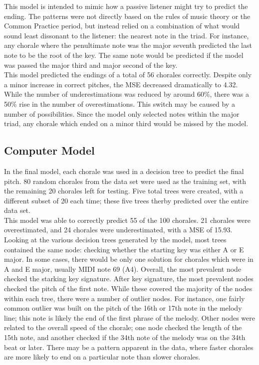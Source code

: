 \documentclass[12pt]{article}
\begin{document}
This model is intended to mimic how a passive listener might try to predict the ending. The patterns were not directly based on the rules of music theory or the Common Practice period, but instead relied on a combination of what would sound least dissonant to the listener: the nearest note in the triad. For instance, any chorale where the penultimate note was the major seventh predicted the last note to be the root of the key. The same note would be predicted if the model was passed the major third and major second of the key.\\

This model predicted the endings of a total of 56 chorales correctly. Despite only a minor increase in correct pitches, the MSE decreased dramatically to 4.32. While the number of underestimations was reduced by around 60\%, there was a 50\% rise in the number of overestimations. This switch may be caused by a number of possibilities. Since the model only selected notes within the major triad, any chorale which ended on a minor third would be missed by the model.

\subsection{Computer Model}
In the final model, each chorale was used in a decision tree to predict the final pitch. 80 random chorales from the data set were used as the training set, with the remaining 20 chorales left for testing. Five total trees were created, with a different subset of 20 each time; these five trees therby predicted over the entire data set.\\

This model was able to correctly predict 55 of the 100 chorales. 21 chorales were overestimated, and 24 chorales were underestimated, with a MSE of 15.93. Looking at the various decision trees generated by the model, most trees contained the same node: checking whether the starting key was either A or E major. In some cases, there would be only one solution for chorales which were in A and E major, usually MIDI note 69 (A4). Overall, the most prevalent node checked the starking key signature. After key signature, the most prevalent nodes checked the pitch of the first note. While these covered the majority of the nodes within each tree, there were a number of outlier nodes. For instance, one fairly common outlier was built on the pitch of the 16th or 17th note in the melody line; this note is likely the end of the first phrase of the melody. Other nodes were related to the overall speed of the chorale; one node checked the length of the 15th note, and another checked if the 34th note of the melody was on the 34th beat or later. There may be a pattern apparent in the data, where faster chorales are more likely to end on a particular note than slower chorales.\\
\end{document}
